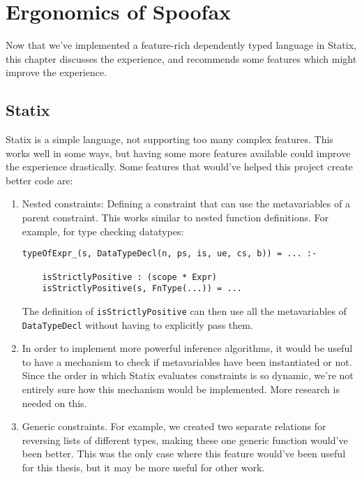 \chapter{Ergonomics of Spoofax}
\label{ch:ergonomics}

Now that we've implemented a feature-rich dependently typed language in Statix, this chapter discusses the experience, and recommends some features which might improve the experience. 

\section{Statix}

Statix is a simple language, not supporting too many complex features. This works well in some ways, but having some more features available could improve the experience drastically. Some features that would've helped this project create better code are:

\begin{enumerate}
	\item Nested constraints: Defining a constraint that can use the metavariables of a parent constraint. This works similar to nested function definitions. For example, for type checking datatypes:
	\begin{lstlisting}
typeOfExpr_(s, DataTypeDecl(n, ps, is, ue, cs, b)) = ... :-

	isStrictlyPositive : (scope * Expr)
	isStrictlyPositive(s, FnType(...)) = ...
	\end{lstlisting}
	The definition of \verb|isStrictlyPositive| can then use all the metavariables of \verb|DataTypeDecl| without having to explicitly pass them.
	
	\item In order to implement more powerful inference algorithms, it would be useful to have a mechanism to check if metavariables have been instantiated or not. Since the order in which Statix evaluates constraints is so dynamic, we're not entirely sure how this mechanism would be implemented. More research is needed on this.
	
	\item Generic constraints. For example, we created two separate relations for reversing lists of different types, making these one generic function would've been better. This was the only case where this feature would've been useful for this thesis, but it may be more useful for other work.
\end{enumerate}

